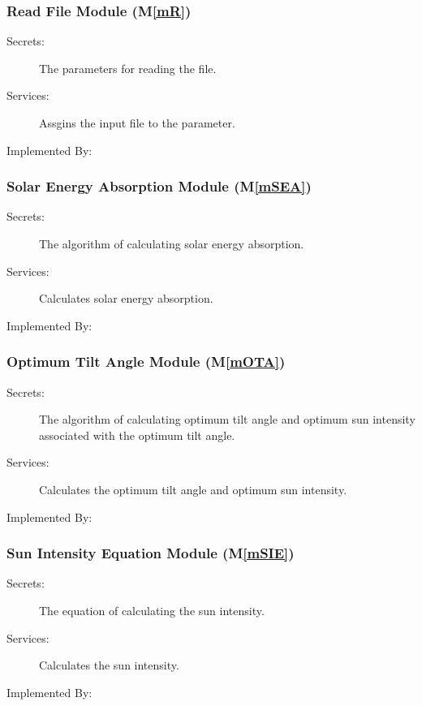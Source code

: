 \documentclass[12pt, titlepage]{article}
\newcommand{\mref}[1]{M\ref{#1}}
\begin{document}
\subsubsection{Read File Module (\mref{mR})}

\begin{description}
\item[Secrets:] The parameters for reading the file.
\item[Services:] Assgins the input file to the parameter.
\item[Implemented By:] \progname
\end{description}

\subsubsection{Solar Energy Absorption Module (\mref{mSEA})}

\begin{description}
\item[Secrets:]The algorithm of calculating solar energy absorption.
\item[Services:] Calculates solar energy absorption.

\item[Implemented By:] \progname
\end{description}


\subsubsection{Optimum Tilt Angle Module (\mref{mOTA})}

\begin{description}
\item[Secrets:]The algorithm of calculating optimum tilt angle and optimum sun intensity associated with the optimum tilt angle.
\item[Services:] Calculates the optimum tilt angle and optimum sun intensity.
\item[Implemented By:] \progname
\end{description}

\subsubsection{Sun Intensity Equation Module (\mref{mSIE})}

\begin{description}
\item[Secrets:]The equation of calculating the sun intensity.
\item[Services:] Calculates the sun intensity.
\item[Implemented By:] \progname
\end{description}
\end{document}
